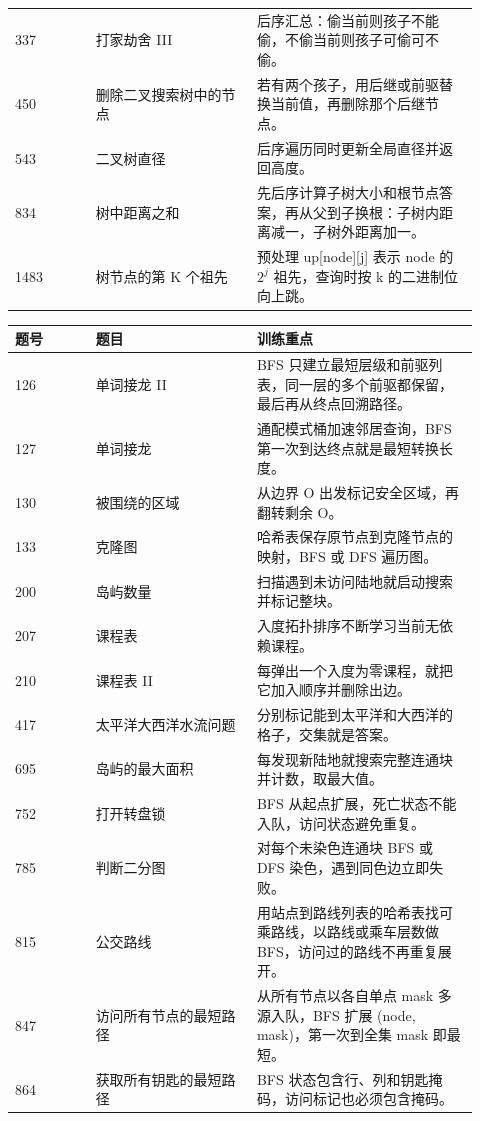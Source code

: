 \begin{longtable}{@{}p{0.16\linewidth}p{0.32\linewidth}p{0.44\linewidth}@{}}
337 & 打家劫舍 III & 后序汇总：偷当前则孩子不能偷，不偷当前则孩子可偷可不偷。\\
450 & 删除二叉搜索树中的节点 & 若有两个孩子，用后继或前驱替换当前值，再删除那个后继节点。\\
543 & 二叉树直径 & 后序遍历同时更新全局直径并返回高度。\\
834 & 树中距离之和 & 先后序计算子树大小和根节点答案，再从父到子换根：子树内距离减一，子树外距离加一。\\
1483 & 树节点的第 K 个祖先 & 预处理 up[node][j] 表示 node 的 \ensuremath{2^{j}} 祖先，查询时按 k 的二进制位向上跳。\\
\bottomrule
\end{longtable}


\begin{longtable}{@{}p{0.16\linewidth}p{0.32\linewidth}p{0.44\linewidth}@{}}
\toprule
题号 & 题目 & 训练重点\\
\midrule
\endhead
126 & 单词接龙 II & BFS 只建立最短层级和前驱列表，同一层的多个前驱都保留，最后再从终点回溯路径。\\
127 & 单词接龙 & 通配模式桶加速邻居查询，BFS 第一次到达终点就是最短转换长度。\\
130 & 被围绕的区域 & 从边界 O 出发标记安全区域，再翻转剩余 O。\\
133 & 克隆图 & 哈希表保存原节点到克隆节点的映射，BFS 或 DFS 遍历图。\\
200 & 岛屿数量 & 扫描遇到未访问陆地就启动搜索并标记整块。\\
207 & 课程表 & 入度拓扑排序不断学习当前无依赖课程。\\
210 & 课程表 II & 每弹出一个入度为零课程，就把它加入顺序并删除出边。\\
417 & 太平洋大西洋水流问题 & 分别标记能到太平洋和大西洋的格子，交集就是答案。\\
695 & 岛屿的最大面积 & 每发现新陆地就搜索完整连通块并计数，取最大值。\\
752 & 打开转盘锁 & BFS 从起点扩展，死亡状态不能入队，访问状态避免重复。\\
785 & 判断二分图 & 对每个未染色连通块 BFS 或 DFS 染色，遇到同色边立即失败。\\
815 & 公交路线 & 用站点到路线列表的哈希表找可乘路线，以路线或乘车层数做 BFS，访问过的路线不再重复展开。\\
847 & 访问所有节点的最短路径 & 从所有节点以各自单点 mask 多源入队，BFS 扩展 (node, mask)，第一次到全集 mask 即最短。\\
864 & 获取所有钥匙的最短路径 & BFS 状态包含行、列和钥匙掩码，访问标记也必须包含掩码。\\

\end{longtable}
